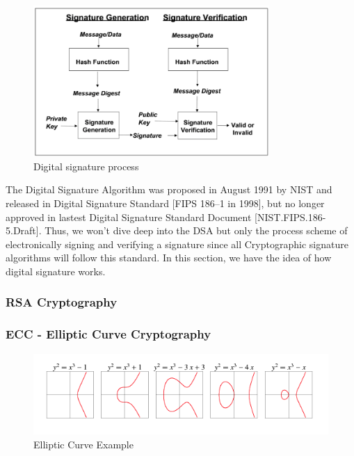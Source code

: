 \begin{figure}[h!]
	\centering
	\includegraphics[width=0.8\textwidth]{images/digital_signature.png}
	\caption[Digital signature process]{Digital signature process}
	\label{fig:digital_signature}
\end{figure}

The Digital Signature Algorithm was proposed in August 1991 by NIST and released in Digital Signature Standard [FIPS 186–1 in 1998], but no longer approved in lastest Digital Signature Standard Document [NIST.FIPS.186-5.Draft]. 
Thus, we won't dive deep into the DSA but only the process scheme of electronically signing and verifying a signature since all Cryptographic signature algorithms will follow this standard. 
In this section, we have the idea of how digital signature works.

\subsubsection{RSA Cryptography}

\subsubsection{ECC - Elliptic Curve Cryptography}
\begin{figure}[h!]
	\centering
	\includegraphics[width=1\textwidth]{images/example_curve.png}
	\caption[Elliptic Curve Example]{Elliptic Curve Example}
	\label{fig:ec_example}
\end{figure}

